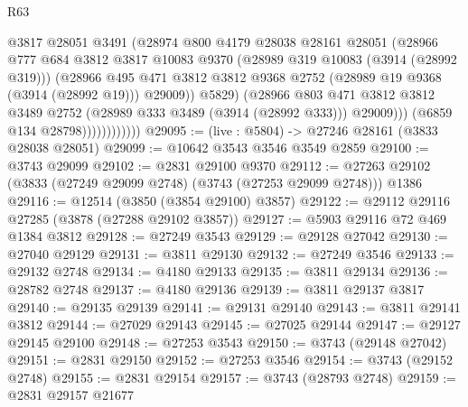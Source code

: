 \begin{lexlean}{R63}
\begin{coremodule}
                              @3817
                              @28051
                              @3491
                              (@28974
                                @800
                                @4179
                                @28038
                                @28161
                                @28051
                                (@28966
                                  @777
                                  @684
                                  @3812
                                  @3817
                                  @10083
                                  @9370
                                  (@28989 @319 @10083 (@3914 (@28992 @319)))
                                  (@28966
                                    @495
                                    @471
                                    @3812
                                    @3812
                                    @9368
                                    @2752
                                    (@28989 @19 @9368 (@3914 (@28992 @19)))
                                    @29009))
                                @5829)
                              (@28966
                                @803
                                @471
                                @3812
                                @3812
                                @3489
                                @2752
                                (@28989 @333 @3489 (@3914 (@28992 @333)))
                                @29009)))
                          (@6859 @134 @28798))))))))))))
@29095 := (live : @5804) -> @27246 @28161 (@3833 @28038 @28051)
@29099 := @10642 @3543 @3546 @3549 @2859
@29100 := @3743 @29099
@29102 := @2831 @29100 @9370
@29112 := @27263 @29102 (@3833 (@27249 @29099 @2748) (@3743 (@27253 @29099 @2748))) @1386
@29116 := @12514 (@3850 (@3854 @29100) @3857)
@29122 := @29112 @29116 @27285 (@3878 (@27288 @29102 @3857))
@29127 := @5903 @29116 @72 @469 @1384 @3812
@29128 := @27249 @3543
@29129 := @29128 @27042
@29130 := @27040 @29129
@29131 := @3811 @29130
@29132 := @27249 @3546
@29133 := @29132 @2748
@29134 := @4180 @29133
@29135 := @3811 @29134
@29136 := @28782 @2748
@29137 := @4180 @29136
@29139 := @3811 @29137 @3817
@29140 := @29135 @29139
@29141 := @29131 @29140
@29143 := @3811 @29141 @3812
@29144 := @27029 @29143
@29145 := @27025 @29144
@29147 := @29127 @29145 @29100
@29148 := @27253 @3543
@29150 := @3743 (@29148 @27042)
@29151 := @2831 @29150
@29152 := @27253 @3546
@29154 := @3743 (@29152 @2748)
@29155 := @2831 @29154
@29157 := @3743 (@28793 @2748)
@29159 := @2831 @29157 @21677

\end{coremodule}
\end{lexlean}
